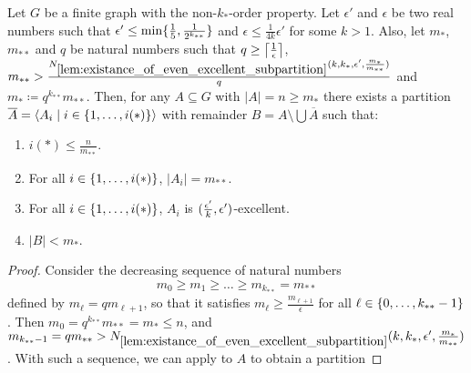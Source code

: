         \begin{lemma} \label{lem:existance_of_excellent_partition_with_equal_size}
            Let $G$ be a finite graph with the non-$k_{*}$-order property.
            Let $\epsilon'$ and $\epsilon$ be two real numbers such that
            $\epsilon' \leq \min \{ \frac{1}{5}, \frac{1}{2^{k_{**}}} \}$ and $\epsilon \leq \frac{1}{4k} \epsilon'$ for some $k > 1$.
            Also, let $m_*$, $m_{**}$ and $q$ be natural numbers such that $q \geq \left\lceil \frac{1}{\epsilon} \right\rceil$,
            $m_{**} > \frac{N_{\ref{lem:existance_of_even_excellent_subpartition}}
                ( k, k_*, \epsilon', \frac{m_*}{m_{**}} )}{q}$ and $m_* \coloneqq q^{k_{**}} m_{**}$.
            Then, for any $A \subseteq G$ with $|A| = n \geq m_*$ there exists a partition
            $\overline{A} = \left< A_i \mid i \in \{ 1, \dots, i(*) \} \right>$ with remainder $B = A \setminus \bigcup \overline{A}$ such that:
            \begin{enumerate}[label={\Roman*}., ref={\Roman*}, font=\rmfamily]
                \item \label{itm:existance_of_excellent_partition_with_equal_size.a} $i(*) \leq \frac{n}{m_{**}}$.
                \item \label{itm:existance_of_excellent_partition_with_equal_size.b} For all
                    $i \in \{ 1, \dots, i(*) \}$, $|A_i| = m_{**}$.
                \item \label{itm:existance_of_excellent_partition_with_equal_size.c} For all
                    $i \in \{ 1, \dots, i(*) \}$, $A_i$ is $( \frac{\epsilon'}{k}, \epsilon' )$-excellent.
                \item \label{itm:existance_of_excellent_partition_with_equal_size.d} $|B| < m_*$.
            \end{enumerate}
            \begin{proof}
                Consider the decreasing sequence of natural numbers
                \[
                    m_0 \geq m_1 \geq \dots \geq m_{k_{**}} = m_{**}
                \]
                defined by $m_\ell = q m_{\ell+1}$, so that it satisfies $m_\ell \geq \frac{m_{\ell+1}}{\epsilon}$ for all
                $\ell \in \{ 0, \dots, k_{**} - 1 \}$.
                Then $m_0 = q^{k_{**}} m_{**} = m_* \leq n$, and $m_{k_{**}-1} = q m_{**} >
                    N_{\ref{lem:existance_of_even_excellent_subpartition}}( k, k_*, \epsilon', \frac{m_*}{m_{**}} )$.
                With such a sequence, we can apply  to $A$ to obtain a partition

\end{proof}
\end{lemma}
